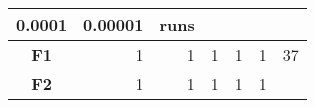 \documentclass[12pt,a4paper]{article}
\begin{document}
\begin{longtable}[c]{@{}crrrrrr@{}}
\begin{minipage}[b]{0.10\columnwidth}
0.0001
\strut\end{minipage} &
\begin{minipage}[b]{0.11\columnwidth}\raggedleft\strut
0.00001
\strut\end{minipage} &
\begin{minipage}[b]{0.07\columnwidth}\raggedleft\strut
runs
\strut\end{minipage}\tabularnewline
\midrule
\endhead
\begin{minipage}[t]{0.11\columnwidth}\centering\strut
\textbf{F1}
\strut\end{minipage} &
\begin{minipage}[t]{0.07\columnwidth}\raggedleft\strut
1
\strut\end{minipage} &
\begin{minipage}[t]{0.08\columnwidth}\raggedleft\strut
1
\strut\end{minipage} &
\begin{minipage}[t]{0.09\columnwidth}\raggedleft\strut
1
\strut\end{minipage} &
\begin{minipage}[t]{0.10\columnwidth}\raggedleft\strut
1
\strut\end{minipage} &
\begin{minipage}[t]{0.11\columnwidth}\raggedleft\strut
1
\strut\end{minipage} &
\begin{minipage}[t]{0.07\columnwidth}\raggedleft\strut
37
\strut\end{minipage}\tabularnewline
\begin{minipage}[t]{0.11\columnwidth}\centering\strut
\textbf{F2}
\strut\end{minipage} &
\begin{minipage}[t]{0.07\columnwidth}\raggedleft\strut
1
\strut\end{minipage} &
\begin{minipage}[t]{0.08\columnwidth}\raggedleft\strut
1
\strut\end{minipage} &
\begin{minipage}[t]{0.09\columnwidth}\raggedleft\strut
1
\strut\end{minipage} &
\begin{minipage}[t]{0.10\columnwidth}\raggedleft\strut
1
\strut\end{minipage} &
\begin{minipage}[t]{0.11\columnwidth}\raggedleft\strut
1
\strut\end{minipage} &
\begin{minipage}[t]{0.07\columnwidth}\raggedleft\strut

\end{minipage}
\end{longtable}
\end{document}

